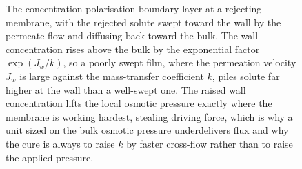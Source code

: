 \begin{figure}[htbp]
\centering
{}
\caption[The concentration-polarisation film at a rejecting
membrane]{The concentration-polarisation boundary layer at a rejecting
membrane, with the rejected solute swept toward the wall by the permeate
flow and diffusing back toward the bulk. The wall concentration rises above
the bulk by the exponential factor $\exp(J_w/k)$, so a poorly swept film,
where the permeation velocity $J_w$ is large against the mass-transfer
coefficient $k$, piles solute far higher at the wall than a well-swept one.
The raised wall concentration lifts the local osmotic pressure exactly where
the membrane is working hardest, stealing driving force, which is why a unit
sized on the bulk osmotic pressure underdelivers flux and why the cure is
always to raise $k$ by faster cross-flow rather than to raise the applied
pressure.}
\label{fig:vol04ch07:polarisation-profile}
\end{figure}
